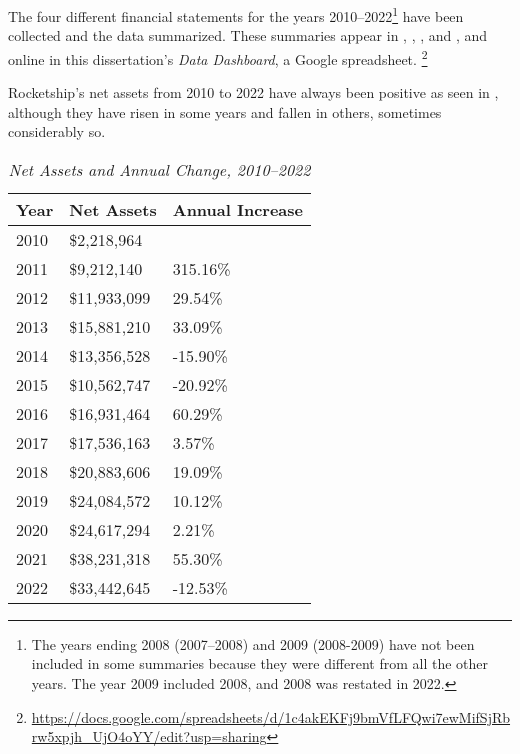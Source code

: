 The four different financial statements for the years 2010–2022\footnote{The years ending 2008 (2007–2008) and 2009 (2008-2009) have not been included in some summaries because they were different from all the other years. The year 2009 included 2008, and 2008 was restated in 2022.} have been collected and the data summarized. These summaries appear in , , , and , and online in this dissertation's \textit{Data Dashboard}, a Google spreadsheet.%
\footnote{\url{https://docs.google.com/spreadsheets/d/1c4akEKFj9bmVfLFQwi7ewMifSjRbrw5xpjh_UjO4oYY/edit?usp=sharing}}

Rocketship's net assets from 2010 to 2022 have always been positive as seen in , although they have risen in some years and fallen in others, sometimes considerably so.
\begin{table}[ht]
  \caption[Net Assets and Annual Change, 2010–2022]{\textit{Net Assets and Annual Change, 2010–2022}}
  \label{tab:net_assets_annual_change}
  \begin{tabular}{lll}
    \toprule
    \textbf{Year} & \textbf{Net Assets} & \textbf{Annual Increase}\\
    \midrule
    2010 &   \$2,218,964	&            \\
    2011 &   \$9,212,140	&   315.16\% \\
    2012 &  \$11,933,099	&    29.54\% \\
    2013 &  \$15,881,210	&    33.09\% \\ 
    2014 &  \$13,356,528	&   -15.90\% \\
    2015 &  \$10,562,747	&   -20.92\% \\
    2016 &  \$16,931,464	&    60.29\% \\
    2017 &  \$17,536,163	&     3.57\% \\
    2018 &  \$20,883,606	&    19.09\% \\
    2019 &  \$24,084,572        &    10.12\% \\
    2020 &  \$24,617,294        &     2.21\% \\
    2021 &  \$38,231,318	&    55.30\% \\ 
    2022 &  \$33,442,645        &   -12.53\% \\
    \bottomrule
  \end{tabular}
\end{table}

